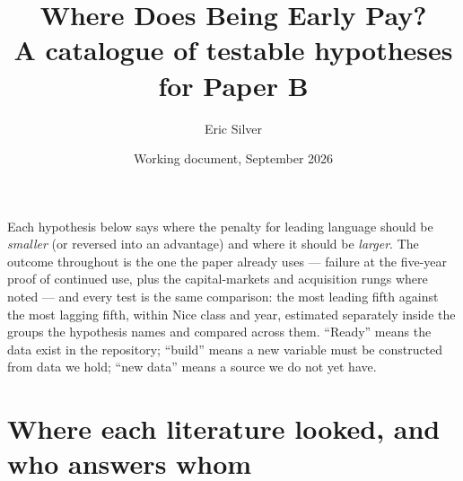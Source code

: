 
\usepackage{longtable}
\usepackage{array}
\graphicspath{{../../}}
\makeatletter{}\makeatother
\title{\bfseries Where Does Being Early Pay?\\
\large A catalogue of testable hypotheses for Paper B}
\author{Eric Silver}
\date{Working document, September 2026}


\maketitle

\noindent Each hypothesis below says where the penalty for leading
language should be \emph{smaller} (or reversed into an advantage) and
where it should be \emph{larger}. The outcome throughout is the one the
paper already uses --- failure at the five-year proof of continued use,
plus the capital-markets and acquisition rungs where noted --- and every
test is the same comparison: the most leading fifth against the most
lagging fifth, within Nice class and year, estimated separately inside
the groups the hypothesis names and compared across them. ``Ready''
means the data exist in the repository; ``build'' means a new variable
must be constructed from data we hold; ``new data'' means a source we
do not yet have.

\section*{Where each literature looked, and who answers whom}

